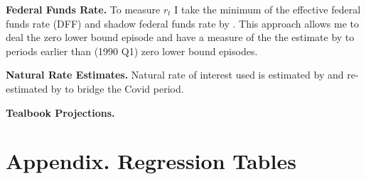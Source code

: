 \documentclass[11pt]{article}
\begin{document}
\noindent\textbf{Federal Funds Rate.}
To measure $r_t$ I take the minimum of the effective federal funds rate (DFF) and shadow federal funds rate by \citet{WuXia2016}. This approach allows me to deal the zero lower bound episode and have a measure of the the estimate by \citet{WuXia2016} to periods earlier than (1990 Q1) zero lower bound episodes. 

\noindent\textbf{Natural Rate Estimates.}
Natural rate of interest used is estimated by \citet{LW2003} and re-estimated by \citet{HLW2023} to bridge the Covid period.

\noindent\textbf{Tealbook Projections.}  



\newpage
\section{Appendix. Regression Tables}
\end{document}
